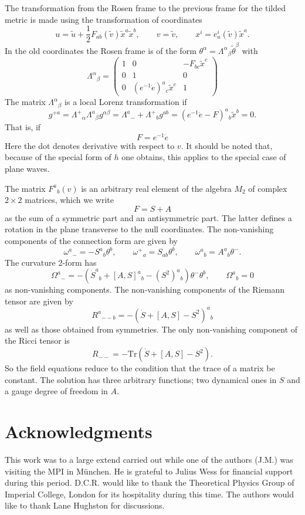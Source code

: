 \documentclass[12pt,a4paper]{article}
\newcounter{eg}
\def\t#1{\tilde #1}
\def\tr{\mbox{Tr}}
\newcommand{\initiate}{\setcounter{equation}{0}}
\begin{document}
The transformation from the Rosen frame to the previous frame for the
tilded metric is made using the transformation of coordinates
$$
u = \t{u} +\frac 12 F_{ab} (\t{v}) \t{x}^a \t{x}^b, \qquad
v = \t{v}, \qquad
x^i = e^i_a (\t{v}) \t{x}^a.
$$
In the old coordinates the Rosen frame is of the form 
$\theta^\alpha = \Lambda^\alpha{}_\beta \t{\theta}^\beta$ with
$$
\Lambda^\alpha{}_\beta = \left(
\begin{array}{ccc}
1 &0 &-F_{bc}\t{x}^c \\[2pt]
0 &1 &0 \\[2pt]
0 &(e^{-1}\dot e)^a{}_c \t{x}^c &1
\end{array}\right)
$$
The matrix $\Lambda^\alpha{}_\beta$ is a local Lorenz transformation
if
$$
g^{+a} = \Lambda^+{}_\alpha \Lambda^a{}_\beta g^{\alpha\beta} =
\Lambda^a{}_- + \Lambda^+{}_b g^{ab} = 
(e^{-1} \dot e - F)^a{}_b \t{x}^b = 0.
$$
That is, if 
$$
F =  e^{-1} \dot e
$$
Here the dot denotes derivative with respect to $v$.  It should be
noted that, because of the special form of $h$ one obtains, this
applies to the special case of plane waves.

The matrix $F^a{}_b(v)$ is an arbitrary real element of the
algebra $M_2$ of complex $2 \times 2$ matrices, which we write
$$
F = S + A
$$
as the sum of a symmetric part and an antisymmetric part.  The
latter defines a rotation in the plane transverse to the null
coordinates.  The non-vanishing components of the connection form are
given by
$$
\omega^a{}_- = -S^a{}_b \theta^b,  \qquad
\omega^+{}_a = S_{ab} \theta^b,  \qquad
\omega^a{}_b = A^a{}_b \theta^-.
$$
The curvature 2-form has 
$$
\Omega^a{}_- = - (\dot S^a{}_b + [A, S]^a{}_b - (S^2)^a{}_b)  
\theta^- \theta^b, \qquad \Omega^a{}_b = 0
$$
as non-vanishing components. The non-vanishing components of the
Riemann tensor are given by
$$
R^a{}_{--b} =  - (\dot S + [A, S] - S^2)^a{}_b
$$
as well as those obtained from symmetries. The only non-vanishing
component of the Ricci tensor is
$$
R_{--} = - \tr (\dot  S + [A, S] - S^2).
$$
So the field equations reduce to the condition that the trace of
a matrix be constant.  The solution has three arbitrary functions; two
dynamical ones in $S$ and a gauge degree of freedom in $A$.




\initiate
\section*{Acknowledgments} This work was to a large extend carried out
while one of the authors (J.M.) was visiting the MPI in M\"unchen. He
is grateful to Julius Wess for financial support during this period.
D.C.R. would like to thank the Theoretical Physics Group of Imperial
College, London for its hospitality during this time. The authors
would like to thank Lane Hughston for discussions.
\end{document}
